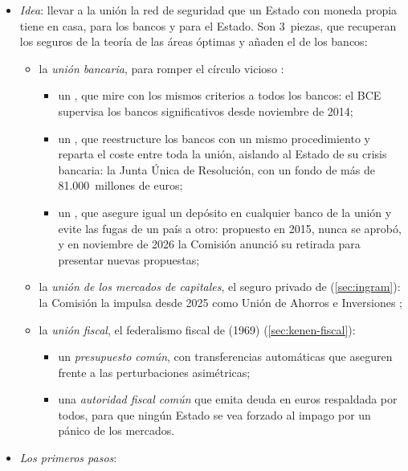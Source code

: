 \documentclass[11pt]{article}
\begin{document}
\begin{itemize}
\item \emph{Idea}: llevar a la unión la red de seguridad que un Estado con moneda propia tiene en casa, para los bancos y para el Estado. Son 3~piezas, que recuperan los seguros de la teoría de las áreas óptimas y añaden el de los bancos:
  \begin{itemize}
  \item la \emph{unión bancaria}, para romper el círculo vicioso :
    \begin{itemize}
    \item un , que mire con los mismos criterios a todos los bancos: el BCE supervisa los bancos significativos desde noviembre de 2014\nocite{RegUE2013MUS};
    \item un , que reestructure los bancos con un mismo procedimiento y reparta el coste entre toda la unión, aislando al Estado de su crisis bancaria: la Junta Única de Resolución, con un fondo de más de 81.000~millones de euros\nocite{RegUE2014MUR,SRB2026FUR};
    \item un , que asegure igual un depósito en cualquier banco de la unión y evite las fugas de un país a otro: propuesto en 2015, nunca se aprobó, y en noviembre de 2026 la Comisión anunció su retirada para presentar nuevas propuestas\nocite{CE2015EDIS};
    \end{itemize}
  \item la \emph{unión de los mercados de capitales}, el seguro privado de  (\ref{sec:ingram}): la Comisión la impulsa desde 2025 como Unión de Ahorros e Inversiones\nocite{CE2025UAI} ;
  \item la \emph{unión fiscal}, el federalismo fiscal de  (1969) (\ref{sec:kenen-fiscal}):
    \begin{itemize}
    \item un \emph{presupuesto común}, con transferencias automáticas que aseguren frente a las perturbaciones asimétricas;
    \item una \emph{autoridad fiscal común} que emita deuda en euros respaldada por todos, para que ningún Estado se vea forzado al impago por un pánico de los mercados.
    \end{itemize}
  \end{itemize}
\item \emph{Los primeros pasos}:
  \begin{itemize}

\end{itemize}
\end{itemize}
\end{document}
